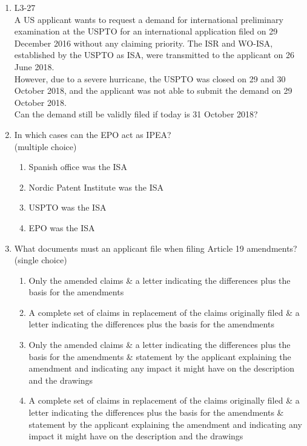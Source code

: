 \documentclass{report}
\begin{document}
\begin{enumerate}[label=\textbf{Question \arabic*}]
    \item %
    L3-27 \\
    A US applicant wants to request a demand for international preliminary examination at the USPTO for an international application filed on 29 December 2016 without any claiming priority. The ISR and WO-ISA, established by the USPTO as ISA, were transmitted to the applicant on 26 June 2018. \\
    However, due to a severe hurricane, the USPTO was closed on 29 and 30 October 2018, and the applicant was not able to submit the demand on 29 October 2018. \\
    Can the demand still be validly filed if today is 31 October 2018?

    \item %
    In which cases can the EPO act as IPEA? \\
    (multiple choice)
    \begin{enumerate}[label=(\alph*)]
        \item Spanish office was the ISA
        \item Nordic Patent Institute was the ISA
        \item USPTO was the ISA
        \item EPO was the ISA
    \end{enumerate}

    \item %
    What documents must an applicant file when filing Article 19 amendments? \\
    (single choice)
    \begin{enumerate}[label=(\alph*)]
        \item Only the amended claims \& a letter indicating the differences plus the basis for the amendments
        \item A complete set of claims in replacement of the claims originally filed \& a letter indicating the differences plus the basis for the amendments 
        \item Only the amended claims \& a letter indicating the differences plus the basis for the amendments \& statement by the applicant explaining the amendment and indicating any impact it might have on the description and the drawings
        \item A complete set of claims in replacement of the claims originally filed \& a letter indicating the differences plus the basis for the amendments \& statement by the applicant explaining the amendment and indicating any impact it might have on the description and the drawings
    \end{enumerate}

\end{enumerate}
\end{document}
